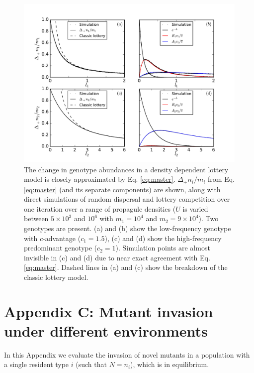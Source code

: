 \documentclass[11pt]{article}
\begin{document}
\begin{figure}
\centering
\includegraphics[scale=0.7]{simulationcomparison.pdf}
\caption{\label{fig:simcomp} The change in genotype abundances in a density dependent lottery model is closely approximated by Eq. \eqref{eq:master}. $\Delta_+ n_i/m_i$ from Eq. \eqref{eq:master} (and its separate components) are shown, along with direct simulations of random dispersal and lottery competition over one iteration over a range of propagule densities ($U$ is varied between $5\times 10^3$ and $10^6$ with $m_1=10^4$ and $m_2=9\times 10^4$). Two genotypes are present. (a) and (b) show the low-frequency genotype with $c$-advantage ($c_1=1.5$), (c) and (d) show the high-frequency predominant genotype ($c_2=1$). Simulation points are almost invisible in (c) and (d) due to near exact agreement with Eq. \eqref{eq:master}. Dashed lines in (a) and (c) show the breakdown of the classic lottery model.} 
\end{figure}

\section*{Appendix C: Mutant invasion under different environments}

In this Appendix we evaluate the invasion of novel mutants in a population with a single resident type $i$ (such that $N=n_i$), which is in equilibrium. 
\end{document}
